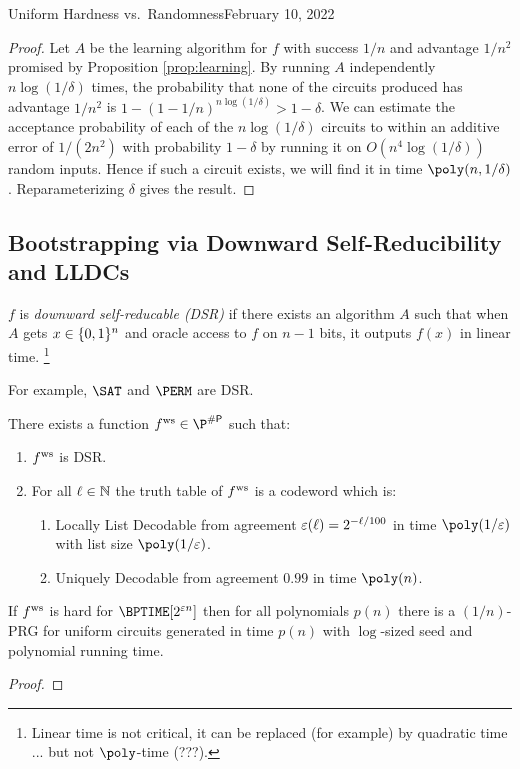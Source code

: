 \begin{lecture}{4}{Uniform Hardness vs.\ Randomness}{February 10, 2022}
\begin{proof}
  Let $A$ be the learning algorithm for $f$ with success $1/n$ and advantage
  $1/n^2$ promised by Proposition \ref{prop:learning}. By running $A$
  independently $n \log(1/\delta)$ times, the probability that none of the
  circuits produced has advantage $1/n^2$ is $1 - (1 - 1/n)^{n\log(1/\delta)} >
  1 - \delta$. We can estimate the acceptance probability of each of the
  $n\log(1/\delta)$ circuits to within an additive error of $1/(2n^2)$ with
  probability $1 - \delta$ by running it on $O(n^4 \log(1/\delta))$ random
  inputs. Hence if such a circuit exists, we will find it in time $\poly(n,
  1/\delta)$. Reparameterizing $\delta$ gives the result.
\end{proof}

\subsection{Bootstrapping via Downward Self-Reducibility and LLDCs}

\begin{definition}
  $f$ is \emph{downward self-reducable (DSR)} if there exists an algorithm $A$
  such that when $A$ gets $x \in \{0, 1\}^n$ and oracle access to $f$ on $n -
  1$ bits, it outputs $f(x)$ in linear time.%
  \footnote{Linear time is not critical, it can be replaced (for example) by quadratic time ... but not $\poly$-time (???).}
\end{definition}

For example, $\SAT$ and $\PERM$ are DSR.

\begin{proposition}
	There exists a function $\fws \in \P^{\sharpp}$ such that:
	\begin{enumerate}
		\item $ f^{\text{ws}} $ is DSR.
		\item For all $\ell \in \mathbb{N}$ the truth table of $ f^{\text{ws}} $ is a codeword
			which is:
			\begin{enumerate}
        \item Locally List Decodable from agreement $\varepsilon(\ell) = 2^{-\ell /
          100}$ in time $\poly(1/\eps)$ with list size $\poly(1 / \eps)$.
        \item Uniquely Decodable from agreement $0.99$ in time $\poly(n)$.
			\end{enumerate}
	\end{enumerate}
\end{proposition}

\begin{theorem}
  If $ f^{\text{ws}} $ is hard for $\BPTIME\brac{2^{\eps n}}$ then for all polynomials
  $p(n)$ there is a $(1 / n)$-PRG for uniform circuits generated in time $p(n)$
  with $\log$-sized seed and polynomial running time.
\end{theorem}

\begin{proof}
\end{proof}

\end{lecture}
